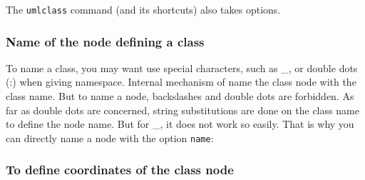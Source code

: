 \documentclass[a4paper,11pt]{report}
\begin{document}
\medskip

\begin{minipage}{0.5\textwidth}

\end{minipage}
\begin{minipage}{0.4\textwidth}
\begin{center}
\end{center}
\end{minipage}

\medskip

The {\tt umlclass} command (and its shortcuts) also takes options.

\subsubsection{Name of the node defining a class}\label{ss.classnodename}

To name a class, you may want use special characters, such as \_{}, or double dots (:) when giving namespace. Internal mechanism of \tuml name the class node with the class name. But to name a \TikZ node, backslashes and double dots are forbidden. As far as double dots are concerned, string substitutions are done on the class name to define the node name. But for \_{}, it does not work so easily. That is why you can directly name a node with the option {\tt name}:

\medskip

\begin{minipage}{0.5\textwidth}

\end{minipage}
\begin{minipage}{0.4\textwidth}
\begin{center}
\end{center}
\end{minipage}

\subsubsection{To define coordinates of the class node}\label{ss.classcoords}

\begin{minipage}{0.5\textwidth}

\end{minipage}
\begin{minipage}{0.4\textwidth}
\begin{center}
\end{center}
\end{minipage}
\end{document}
